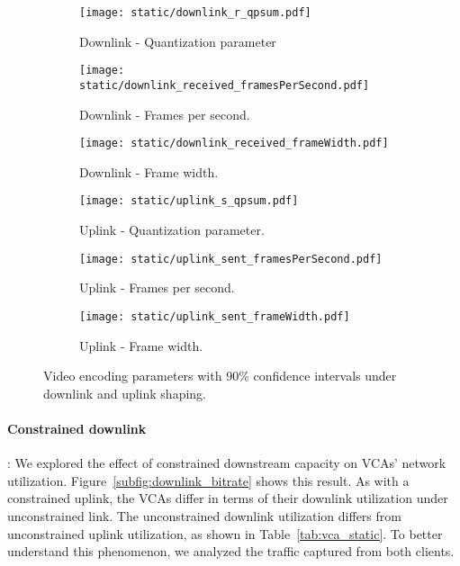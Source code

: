 \begin{figure*}[t]
    \begin{subfigure}[t]{0.33\textwidth}
    		\centering
        \texttt{[image: static/downlink\_r\_qpsum.pdf]}
        \caption{Downlink - Quantization parameter}
 		\label{subfig:downlink_video_qp}
    \end{subfigure}%
    \hfill
	\begin{subfigure}[t]{0.33\textwidth}
        \centering
        \texttt{[image: static/downlink\_received\_framesPerSecond.pdf]}
    \caption{Downlink - Frames per second.}
    \label{subfig:downlink_frames_per_second}
    \end{subfigure}%
    \hfill
	\begin{subfigure}[t]{0.33\textwidth}
        \centering
        \texttt{[image: static/downlink\_received\_frameWidth.pdf]}
    \caption{Downlink - Frame width.}
    \label{subfig:downlink_frame_width}
    \end{subfigure}
    \newline
        \begin{subfigure}[t]{0.33\textwidth}
    		\centering
        \texttt{[image: static/uplink\_s\_qpsum.pdf]}
        \caption{Uplink - Quantization parameter.}
 		\label{subfig:uplink_video_qp}
    \end{subfigure}%
    \hfill
	\begin{subfigure}[t]{0.33\textwidth}
        \centering
        \texttt{[image: static/uplink\_sent\_framesPerSecond.pdf]}
    \caption{Uplink - Frames per second.}
    \label{subfig:uplink_frames_per_second}
    \end{subfigure}%
    \hfill
	\begin{subfigure}[t]{0.33\textwidth}   
        \centering
        \texttt{[image: static/uplink\_sent\_frameWidth.pdf]}
    \caption{Uplink - Frame width.}
    \label{subfig:uplink_frame_width}
    \end{subfigure}
	\caption{Video encoding parameters with 90\% confidence intervals under downlink and uplink shaping.}
	\label{fig:video_qual}
\end{figure*}



\paragraph{Constrained downlink}: We explored the effect of constrained
downstream capacity
on VCAs' network utilization. Figure~\ref{subfig:downlink_bitrate} shows this
result.
As with a constrained uplink, the VCAs differ in terms of their downlink
utilization under unconstrained link. The unconstrained downlink utilization
differs from unconstrained uplink utilization, as shown in
Table~\ref{tab:vca_static}. To better understand this phenomenon, we analyzed the traffic
captured from both clients. 

